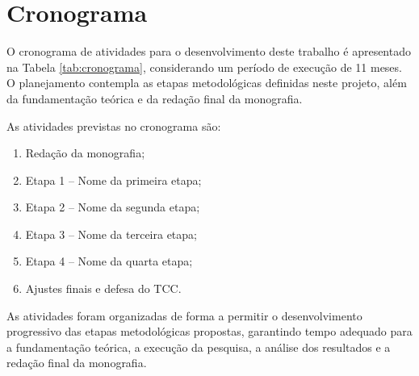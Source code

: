 \chapter{Cronograma}
\label{cap:cronograma}

O cronograma de atividades para o desenvolvimento deste trabalho é apresentado na Tabela \ref{tab:cronograma}, considerando um período de execução de 11 meses. O planejamento contempla as etapas metodológicas definidas neste projeto, além da fundamentação teórica e da redação final da monografia.

As atividades previstas no cronograma são:

\begin{enumerate}
    \item Redação da monografia;
    \item Etapa 1 -- Nome da primeira etapa;
    \item Etapa 2 -- Nome da segunda etapa;
    \item Etapa 3 -- Nome da terceira etapa;
    \item Etapa 4 -- Nome da quarta etapa;
    \item Ajustes finais e defesa do TCC.
\end{enumerate}

\begin{table}[htb]
\end{table}

As atividades foram organizadas de forma a permitir o desenvolvimento progressivo das etapas metodológicas propostas, garantindo tempo adequado para a fundamentação teórica, a execução da pesquisa, a análise dos resultados e a redação final da monografia.
